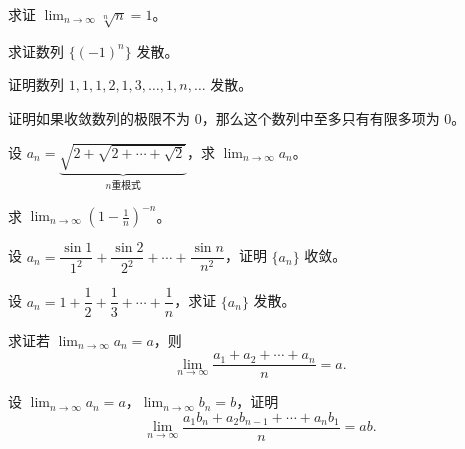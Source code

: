 \noindent\begin{minipage}{\textwidth}
求证 $\displaystyle\lim_{n\to\infty}\sqrt[n]{n}=1$。
\end{minipage}\par\vfill
\noindent\begin{minipage}{\textwidth}
求证数列 $\{(-1)^n\}$ 发散。
\end{minipage}\par\vfill
\noindent\begin{minipage}{\textwidth}
证明数列 $1,1,1,2,1,3,\ldots,1,n,\ldots$ 发散。
\end{minipage}\par\vfill
\newpage
\noindent\begin{minipage}{\textwidth}
证明如果收敛数列的极限不为 $0$，那么这个数列中至多只有有限多项为 $0$。
\end{minipage}\par\vfill
\noindent\begin{minipage}{\textwidth}
设 $a_n=\underbrace{\sqrt{2+\sqrt{2+\cdots+\sqrt2}}}_{n\text{重根式}}$，求 $\displaystyle\lim_{n\to\infty}a_n$。
\end{minipage}\par\vfill
\noindent\begin{minipage}{\textwidth}
求 $\displaystyle\lim_{n\to\infty}\left(1-\frac1n\right)^{-n}$。
\end{minipage}\par\vfill
\noindent\begin{minipage}{\textwidth}
设 $a_n=\dfrac{\sin1}{1^2}+\dfrac{\sin2}{2^2}+\cdots+\dfrac{\sin n}{n^2}$，证明 $\{a_n\}$ 收敛。
\end{minipage}\par\vfill
\newpage
\noindent\begin{minipage}{\textwidth}
设 $a_n=1+\dfrac12+\dfrac13+\cdots+\dfrac1n$，求证 $\{a_n\}$ 发散。
\end{minipage}\par\vfill
\noindent\begin{minipage}{\textwidth}
求证若 $\displaystyle\lim_{n\to\infty}a_n=a$，则\[\lim_{n\to\infty}\frac{a_1+a_2+\cdots+a_n}{n}=a.\]
\end{minipage}\par\vfill
\noindent\begin{minipage}{\textwidth}
设 $\displaystyle\lim_{n\to\infty}a_n=a$，$\displaystyle\lim_{n\to\infty}b_n=b$，证明\[\lim_{n\to\infty}\frac{a_1b_n+a_2b_{n-1}+\cdots+a_nb_1}{n}=ab.\]
\end{minipage}\par\vfill
